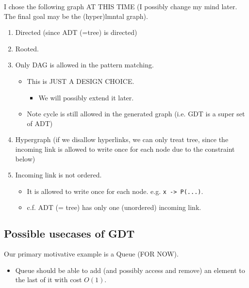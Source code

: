 \documentclass[11pt]{article}
\begin{document}
I chose the following graph AT THIS TIME
(I possibly change my mind later. The final goal may be the (hyper)lmntal graph).
\begin{enumerate}
\item Directed (since ADT (=tree) is directed)
\item Rooted.
\item Only DAG is allowed in the pattern matching.
\begin{itemize}
\item This is JUST A DESIGN CHOICE.
\begin{itemize}
\item We will possibly extend it later.
\end{itemize}
\item Note cycle is still allowed in the generated graph (i.e. GDT is a super set of ADT)
\end{itemize}
\item Hypergraph
(if we disallow hyperlinks, we can only treat tree,
since the incoming link is allowed to write once for each node due to the constraint below)
\item Incoming link is not ordered.
\begin{itemize}
\item It is allowed to write once for each node. e.g. \texttt{x -> P(...)}.
\item c.f. ADT (= tree) has only one (unordered) incoming link.
\end{itemize}
\end{enumerate}


\subsection{Possible usecases of GDT}
\label{sec:orgb686864}
Our primary motivative example is a Queue (FOR NOW).
\begin{itemize}
\item Queue should be able to add (and possibly access and remove) an element to the last of it with cost \(O(1)\).
\end{itemize}
\end{document}
